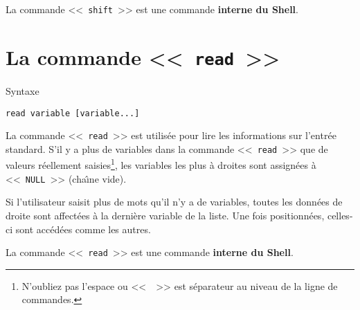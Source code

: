 La commande <<~\texttt{shift}~>> est une commande \textbf{interne du Shell}.

\section{La commande <<~\texttt{read}~>>}

\begin{definition}{Syntaxe}
\begin{verbatim}
read variable [variable...]
\end{verbatim}
\end{definition}

La commande <<~\texttt{read}~>> est utilis{\'e}e pour lire les informations sur
l{'}entr{\'e}e standard. S'il y a plus de variables dans la commande
<<~\texttt{read}~>> que de valeurs r{\'e}ellement saisies\footnote{N'oubliez pas
l'espace ou <<~\spacekey{}~>> est s{\'e}parateur au niveau de la ligne
de commandes.}, les variables les plus {\`a} droites sont assign{\'e}es {\`a}
<<~\texttt{NULL}~>> (cha{\^\i}ne vide).

Si l'utilisateur saisit plus de mots qu'il n'y a de variables, toutes les donn{\'e}es
de droite sont affect{\'e}es {\`a} la derni{\`e}re variable de la liste.
Une fois positionn{\'e}es, celles-ci sont acc{\'e}d{\'e}es comme les autres.

La commande <<~\texttt{read}~>> est une commande \textbf{interne du Shell}.

